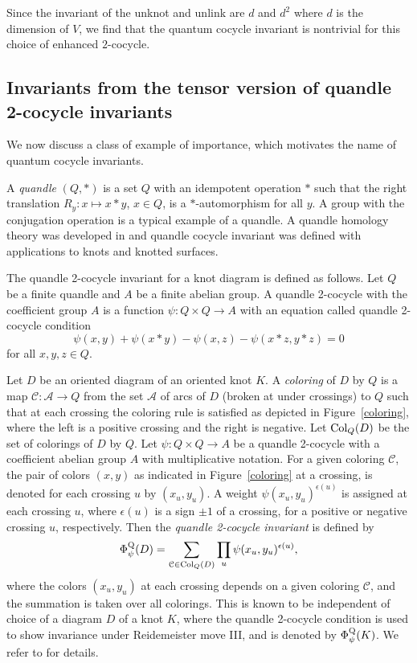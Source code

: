 \documentclass[11pt,fleqn]{amsart} %
\newcommand{\cal}{\mathcal}
\begin{document}
Since the invariant of the unknot and unlink are $d$ and $d^2$ where $d$ is  the dimension of $V$, we find that the quantum cocycle invariant is nontrivial for this choice of enhanced $2$-cocycle. 

\subsection{Invariants from the tensor version of quandle 2-cocycle invariants} \label{subsec:Q}


We now discuss a class of example of importance, which motivates the name of quantum cocycle invariants.
	
	A {\it quandle} $(Q, *)$ is a set $Q$ with an idempotent operation  $*$ such that 
	the right translation $R_y: x \mapsto x*y$, $x\in Q$,  is a $*$-automorphism for all $y$. 
	A group with the conjugation operation is a typical example of a quandle.
	A quandle homology theory was developed in \cite{CJKLS} and quandle cocycle invariant was defined with 
	applications to knots and knotted surfaces. 
	
	The quandle 2-cocycle invariant for a knot diagram is defined as follows. Let  $Q$ be a finite quandle and $A$ be a finite abelian group.
			A quandle 2-cocycle with the coefficient group $A$ is a function $\psi: Q \times Q \rightarrow  A$ with an
			equation called quandle 2-cocycle condition
			$$ \psi (x,y) + \psi (x*y) - \psi(x,z) - \psi (x * z, y * z ) =0 $$
			for all $x,y,z \in Q$. 
						
Let $D$ be an oriented  diagram of an oriented  knot $K$.
A {\it coloring} of $D$ by $Q$ is a map ${\cal C} : {\cal A} \rightarrow Q$
from the set ${\cal A}$ of arcs of $D$ (broken at under crossings) to $Q$ such that at each crossing 
the coloring rule is satisfied as depicted in  Figure~\ref{coloring}, where the left is a positive crossing and the right is negative.
Let ${\rm Col}_Q(D)$ be the set of colorings of $D$ by $Q$. 
Let $\psi: Q \times Q \rightarrow A$ be a quandle 2-cocycle with a coefficient abelian group $A$ with multiplicative notation. 
For a given coloring ${\cal C}$,  the pair of colors $(x,y)$ 
as indicated in Figure~\ref{coloring} at a crossing, is denoted for each crossing $u$ by $(x_u, y_u)$.
A weight $\psi (x_u, y_u)^{\epsilon (u) }$ is assigned at each crossing $u$, where $\epsilon(u)$ is a sign $\pm 1$ of a crossing, for a  positive or negative crossing $u$, respectively.
Then the {\it quandle 2-cocycle invariant} is defined by 
$$\Phi_\psi^{\rm Q} (D)=  \sum_{{\cal C} \in {\rm Col}_Q(D)} \prod_{u} \psi (x_u, y_u)^{\epsilon (u) } , $$
where the colors $(x_u, y_u)$ at each crossing depends on a given coloring ${\mathcal C}$, and 
the summation is taken over all colorings.
This is known to be independent of choice of a diagram $D$ of a knot $K$,
where the quandle 2-cocycle condition is used to show invariance under Reidemeister move III,  and is denoted by $\Phi_\psi^{\rm Q} (K)$.
We refer to \cite{CJKLS} for details.
\end{document}
